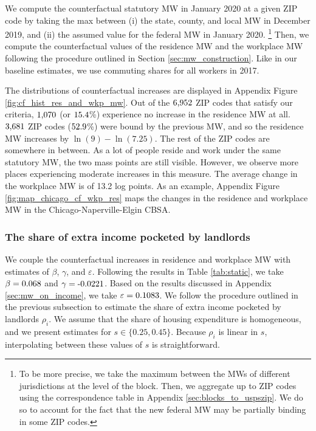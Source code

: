We compute the counterfactual statutory MW in January 2020 at a given ZIP code 
by taking the max between (i) the state, county, and local MW in December 2019, 
and (ii) the assumed value for the federal MW in January 2020.%
\footnote{To be more precise, we take the maximum between the MWs of different
jurisdictions at the level of the block.
Then, we aggregate up to ZIP codes using the correspondence table in Appendix 
\ref{sec:blocks_to_uspszip}.
We do so to account for the fact that the new federal MW may be partially binding
in some ZIP codes.}
Then, we compute the counterfactual values of the residence MW and the workplace
MW following the procedure outlined in Section \ref{sec:mw_construction}.
Like in our baseline estimates, we use commuting shares for all workers in
2017.

The distributions of counterfactual increases are displayed in Appendix
Figure \ref{fig:cf_hist_res_and_wkp_mw}.
Out of the $\textnormal{6,952}$ ZIP codes that satisfy our criteria, $\textnormal{1,070}$ (or $\textnormal{15.4}$\%) 
experience no increase in the residence MW at all.
$\textnormal{3,681}$ ZIP codes ($\textnormal{52.9}$\%) were bound by the previous MW, and so the residence MW
increases by $\ln(9)-\ln(7.25)$.
The rest of the ZIP codes are somewhere in between.
As a lot of people reside and work under the same statutory MW, the two mass
points are still visible.
However, we observe more places experiencing moderate increases in this measure.
The average change in the workplace MW is of 13.2 log points.
As an example, Appendix Figure \ref{fig:map_chicago_cf_wkp_res} maps the changes 
in the residence and workplace MW in the Chicago-Naperville-Elgin CBSA.

\subsubsection*{The share of extra income pocketed by landlords}
\label{sec:cf_rents_and_wage_changes}

We couple the counterfactual increases in residence and workplace MW with 
estimates of $\beta$, $\gamma$, and $\varepsilon$.
Following the results in Table \ref{tab:static}, we take 
$\beta = \textnormal{0.068}$ and 
$\gamma = \textnormal{-0.0221}$.
Based on the results discussed in Appendix \ref{sec:mw_on_income}, we take
$\varepsilon = \textnormal{0.1083}$.
We follow the procedure outlined in the previous subsection to estimate the 
share of extra income pocketed by landlords $\rho_i$.
We assume that the share of housing expenditure is homogeneous, and 
we present estimates for $s\in\{0.25, 0.45\}$.
Because $\rho_i$ is linear in $s$, interpolating between these values of 
$s$ is straightforward.

